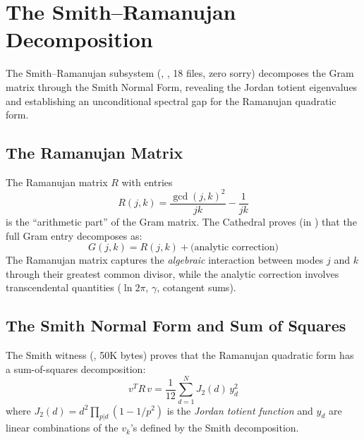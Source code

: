 \section{The Smith--Ramanujan Decomposition}
\label{sec:smith}

The Smith--Ramanujan subsystem (,
, 18 files, zero sorry) decomposes
the Gram matrix through the Smith Normal Form, revealing the
Jordan totient eigenvalues and establishing an unconditional
spectral gap for the Ramanujan quadratic form.

\subsection{The Ramanujan Matrix}

The Ramanujan matrix $R$ with entries
\begin{equation}
  R(j,k) = \frac{\gcd(j,k)^2}{jk} - \frac{1}{jk}
  \label{eq:ramanujan-entry}
\end{equation}
is the ``arithmetic part'' of the Gram matrix. The Cathedral proves
(in ) that the full Gram entry decomposes as:
\begin{equation}
  G(j,k) = R(j,k) + \text{(analytic correction)}
  \label{eq:gram-ramanujan}
\end{equation}
The Ramanujan matrix captures the \emph{algebraic} interaction between
modes $j$ and $k$ through their greatest common divisor, while the
analytic correction involves transcendental quantities
($\ln 2\pi$, $\gamma$, cotangent sums).

\subsection{The Smith Normal Form and Sum of Squares}

The Smith witness (, 50K bytes) proves that
the Ramanujan quadratic form has a sum-of-squares decomposition:
\begin{equation}
  v^T R\, v = \frac{1}{12} \sum_{d=1}^{N} J_2(d)\, y_d^2
  \label{eq:sos}
\end{equation}
where $J_2(d) = d^2 \prod_{p | d}(1 - 1/p^2)$ is the
\emph{Jordan totient function} and $y_d$ are linear combinations of the
$v_k$'s defined by the Smith decomposition.

